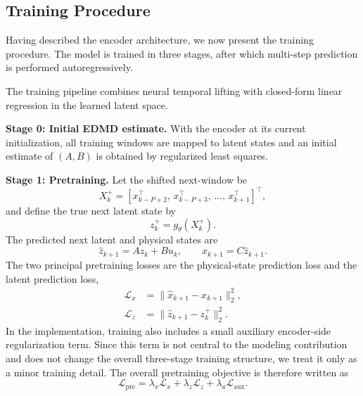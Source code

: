 \documentclass[journal]{IEEEtran}
\begin{document}
\subsection{Training Procedure}
\label{sec:training}

Having described the encoder architecture, we now present the training procedure. The model is trained in three stages, after which multi-step prediction is performed autoregressively.

The training pipeline combines neural temporal lifting with closed-form linear regression in the learned latent space.

\textbf{Stage 0: Initial EDMD estimate.} With the encoder at its current initialization, all training windows are mapped to latent states and an initial estimate of $(A,B)$ is obtained by regularized least squares.

\textbf{Stage 1: Pretraining.} Let the shifted next-window be
\begin{equation}
    X_k^{+} = [x_{k-P+2}^\top,\,x_{k-P+3}^\top,\,\ldots,\,x_{k+1}^\top]^\top,
\end{equation}
and define the true next latent state by
\begin{equation}
    z_k^{+} = g_\theta(X_k^{+}).
\end{equation}
The predicted next latent and physical states are
\begin{equation}
    \hat{z}_{k+1} = Az_k + Bu_k,
    \qquad
    \hat{x}_{k+1} = C\hat{z}_{k+1}.
\end{equation}
The two principal pretraining losses are the physical-state prediction loss and the latent prediction loss,
\begin{align}
    \mathcal{L}_{x} &= \|\hat{x}_{k+1}-x_{k+1}\|_2^2,
    \\
    \mathcal{L}_{z} &= \|\hat{z}_{k+1}-z_k^{+}\|_2^2.
\end{align}
In the implementation, training also includes a small auxiliary encoder-side regularization term. Since this term is not central to the modeling contribution and does not change the overall three-stage training structure, we treat it only as a minor training detail. The overall pretraining objective is therefore written as
\begin{equation}
    \mathcal{L}_{\mathrm{pre}} = \lambda_x\mathcal{L}_x + \lambda_z\mathcal{L}_z + \lambda_a\mathcal{L}_{\mathrm{aux}}.
    \label{eq:pretraining_loss}
\end{equation}
\end{document}
